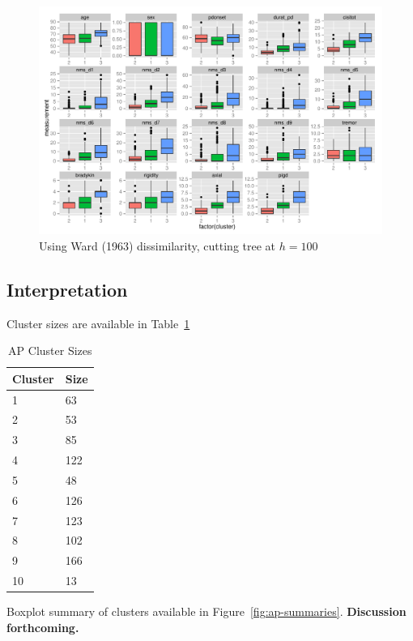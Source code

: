 \documentclass[letterpaper,12pt]{article}
\begin{document}
\begin{figure}[h]
  \centering
  \includegraphics[width=\linewidth]{hc-summaries-ward-D-h100.pdf}
  \caption{Using Ward (1963) dissimilarity, cutting tree at $h = 100$}
  \label{fig:hc-summaries-ward-D-h100}
\end{figure}


\subsection{Interpretation}

Cluster sizes are available in Table~\ref{tab:ap-cluster-sizes}

\begin{table}[h]
  \centering
  \begin{tabular}{l|l}
  Cluster & Size \\
  \hline
  1 & 63 \\
  2 & 53 \\
  3 & 85 \\
  4 & 122 \\
  5 & 48 \\
  6 & 126 \\
  7 & 123 \\
  8 & 102 \\
  9 & 166 \\
  10 & 13 \\
  \end{tabular}
  \caption{AP Cluster Sizes}
  \label{tab:ap-cluster-sizes}
\end{table}

Boxplot summary of clusters available in Figure~\ref{fig:ap-summaries}.
\textbf{Discussion forthcoming.}
\end{document}
